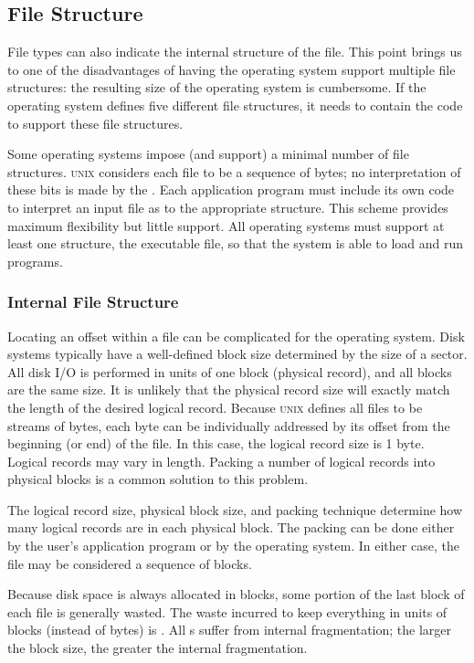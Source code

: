 \subsection{File Structure}\label{subsec:File_Structure}
File types can also indicate the internal structure of the file.
This point brings us to one of the disadvantages of having the operating system support multiple file structures: the resulting size of the operating system is cumbersome.
If the operating system defines five different file structures, it needs to contain the code to support these file structures.

Some operating systems impose (and support) a minimal number of file structures.
\textsc{unix} considers each file to be a sequence of bytes; no interpretation of these bits is made by the \textbf{}.
Each application program must include its own code to interpret an input file as to the appropriate structure.
This scheme provides maximum flexibility but little support.
All operating systems must support at least one structure, the executable file, so that the system is able to load and run programs.

\subsubsection{Internal File Structure}\label{subsubsec:Internal_File_Structure}
Locating an offset within a file can be complicated for the operating system.
Disk systems typically have a well-defined block size determined by the size of a sector.
All disk I/O is performed in units of one block (physical record), and all blocks are the same size.
It is unlikely that the physical record size will exactly match the length of the desired logical record.
Because \textsc{unix} defines all files to be streams of bytes, each byte can be individually addressed by its offset from the beginning (or end) of the file.
In this case, the logical record size is 1 byte.
Logical records may vary in length.
Packing a number of logical records into physical blocks is a common solution to this problem.

The logical record size, physical block size, and packing technique determine how many logical records are in each physical block.
The packing can be done either by the user’s application program or by the operating system.
In either case, the file may be considered a sequence of blocks.

Because disk space is always allocated in blocks, some portion of the last block of each file is generally wasted.
The waste incurred to keep everything in units of blocks (instead of bytes) is .
All s suffer from internal fragmentation; the larger the block size, the greater the internal fragmentation.

